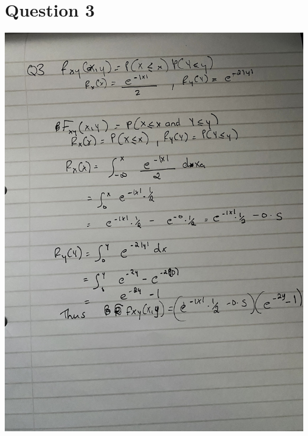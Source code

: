 \documentclass[11pt]{article} %
\begin{document}
\section{Question 3}
\begin{center}
\includegraphics[scale = 0.15]{IMG_1690.jpg}
\newpage

\end{center}
\end{document}
